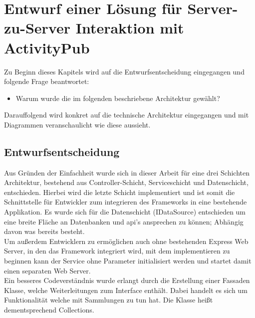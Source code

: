 \chapter{Entwurf einer Lösung für Server-zu-Server Interaktion mit ActivityPub}
	Zu Beginn dieses Kapitels wird auf die Entwurfsentscheidung eingegangen und folgende Frage beantwortet:
	\begin{itemize}
		\item Warum wurde die im folgenden beschriebene Architektur gewählt?
	\end{itemize}
	Darauffolgend wird konkret auf die technische Architektur eingegangen und mit Diagrammen veranschaulicht wie diese aussieht.
\section{Entwurfsentscheidung}
	Aus Gründen der Einfachheit wurde sich in dieser Arbeit für eine drei Schichten Architektur, bestehend aus Controller-Schicht, Serviceschicht und Datenschicht, entschieden. Hierbei wird die letzte Schicht implementiert und ist somit die Schnittstelle für Entwickler zum integrieren des Frameworks in eine bestehende Applikation. Es wurde sich für die Datenschicht (IDataSource) entschieden um eine breite Fläche an Datenbanken und \gls{api}'s ansprechen zu können; Abhängig davon was bereits besteht.\\
	
	Um außerdem Entwicklern zu ermöglichen auch ohne bestehenden Express Web Server, in den das Framework integriert wird, mit dem implementieren zu beginnen kann der Service ohne Parameter initialisiert werden und startet damit einen separaten Web Server.\\
	
	Ein besseres Codeverständnis wurde erlangt durch die Erstellung einer Fassaden Klasse, welche Weiterleitungen zum Interface enthält. Dabei handelt es sich um Funktionalität welche mit Sammlungen zu tun hat. Die Klasse heißt dementsprechend \glqq Collections\grqq.\\
	
